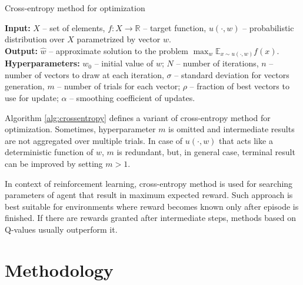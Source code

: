 \documentclass{article}
\begin{document}
\begin{algorithm}
	\caption{Cross-entropy method for optimization} \label{alg:crossentropy}
	\textbf{Input:} $X$ -- set of elements, $f: X \to \mathbb{R}$ -- target function, $u(\cdot, w)$ -- probabilistic distribution over $X$ parametrized by vector $w$. \\
	\textbf{Output:} $\hat{w}$ -- approximate solution to the problem $\max_w \mathbb{E}_{x \sim u(\cdot, w)} f(x)$. \\
	\textbf{Hyperparameters:} $w_0$ -- initial value of $w$; $N$ -- number of iterations, $n$ -- number of vectors to draw at each iteration, $\sigma$ -- standard deviation for vectors generation, $m$ -- number of trials for each vector; $\rho$ -- fraction of best vectors to use for update; $\alpha$ -- smoothing coefficient of updates.
	\begin{algorithmic}[1]
		    \ENDFOR
		\ENDFOR
	\end{algorithmic}
\end{algorithm}

Algorithm \ref{alg:crossentropy} defines a variant of cross-entropy method for optimization. Sometimes, hyperparameter $m$ is omitted and intermediate results are not aggregated over multiple trials. In case of $u(\cdot, w)$ that acts like a deterministic function of $w$, $m$ is redundant, but, in general case, terminal result can be improved by setting $m > 1$.

In context of reinforcement learning, cross-entropy method is used for searching parameters of agent that result in maximum expected reward. Such approach is best suitable for environments where reward becomes known only after episode is finished. If there are rewards granted after intermediate steps, methods based on Q-values usually outperform it.


\section{Methodology}
\label{sec:methodology}
\end{document}
